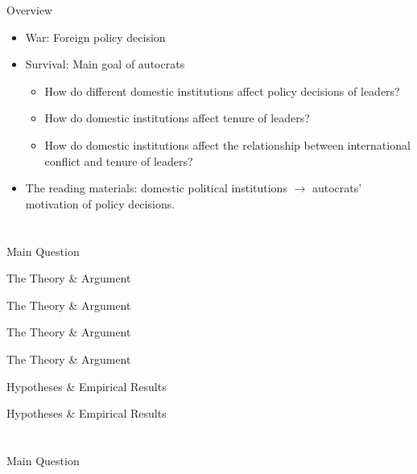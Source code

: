 \documentclass{Bredelebeamer}\usepackage[]{graphicx}\usepackage[]{color}
\begin{document}
\begin{frame}{Overview}
	\begin{itemize}
		\item[] War: Foreign policy decision
		\item[] Survival: Main goal of autocrats
		\begin{itemize}
			\item How do different domestic institutions affect policy decisions of leaders?
			\item How do domestic institutions affect tenure of leaders?
			\item How do domestic institutions affect the relationship between international conflict and tenure of leaders?		
		\end{itemize}
		\item The reading materials: domestic political institutions $\rightarrow$ autocrats' motivation of policy decisions.
	\end{itemize}

\section{\cite{Weeks2008}}
\begin{frame}{Main Question}

\end{frame}
\begin{frame}{The Theory \& Argument}

\end{frame}
\begin{frame}{The Theory \& Argument}

\end{frame}
\begin{frame}{The Theory \& Argument}

\end{frame}

\begin{frame}{The Theory \& Argument}

\end{frame}
\begin{frame}{Hypotheses \& Empirical Results}

\end{frame}
\begin{frame}{Hypotheses \& Empirical Results}

\end{frame}

\section{\cite{Fjelde2010}}
\begin{frame}{Main Question}


\end{frame}
\end{frame}
\end{document}
